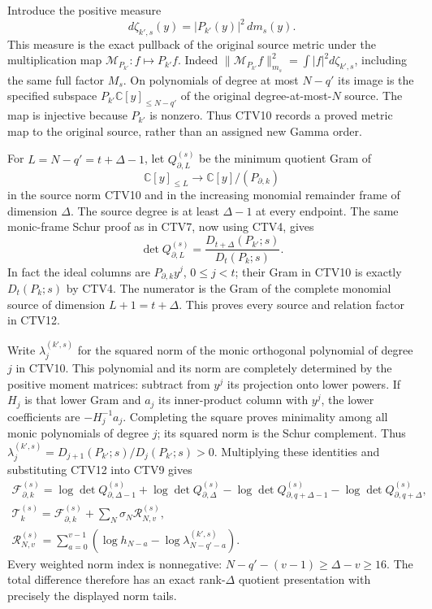 \documentclass[11pt,a4paper]{article}
\begin{document}
Introduce the positive measure
\[
 d\zeta_{k',s}(y)=|P_{k'}(y)|^2\,dm_s(y).
 \tag{CTV10}
\]
This measure is the exact pullback of the original source metric
under the multiplication map
$\mathcal M_{P_{k'}}:f\mapsto P_{k'}f$.
Indeed $\|\mathcal M_{P_{k'}}f\|_{m_s}^2
=\int|f|^2d\zeta_{k',s}$, including the same full factor $M_s$.
On polynomials of degree at most $N-q'$ its image is the specified
subspace $P_{k'}\mathbb C[y]_{\le N-q'}$ of the original
degree-at-most-$N$ source. The map is injective because $P_{k'}$
is nonzero. Thus CTV10 records a proved metric map to the
original source, rather than an assigned new Gamma order.

For $L=N-q'=t+\Delta-1$, let
$Q_{\partial,L}^{(s)}$ be the minimum quotient Gram of
\[
 \mathbb C[y]_{\le L}\longrightarrow
       \mathbb C[y]/(P_{\partial,k})
 \tag{CTV11}
\]
in the source norm CTV10 and in the increasing monomial
remainder frame of dimension $\Delta$.
The source degree is at least $\Delta-1$ at every endpoint.
The same monic-frame Schur proof as in CTV7, now using CTV4,
gives
\[
 \det Q_{\partial,L}^{(s)}
     =\frac{D_{t+\Delta}(P_{k'};s)}{D_t(P_k;s)} .
 \tag{CTV12}
\]
In fact the ideal columns are $P_{\partial,k}y^j$, $0\le j<t$;
their Gram in CTV10 is exactly $D_t(P_k;s)$ by CTV4.
The numerator is the Gram of the complete monomial source
of dimension $L+1=t+\Delta$. This proves every source and
relation factor in CTV12.

Write $\lambda_j^{(k',s)}$ for the squared norm of the monic
orthogonal polynomial of degree $j$ in CTV10. This polynomial
and its norm are completely determined by the positive moment
matrices: subtract from $y^j$ its projection onto lower powers.
If $H_j$ is that lower Gram and $a_j$ its inner-product column
with $y^j$, the lower coefficients are $-H_j^{-1}a_j$.
Completing the square proves minimality among all monic
polynomials of degree $j$; its squared norm is the Schur
complement. Thus
$\lambda_j^{(k',s)}=D_{j+1}(P_{k'};s)/D_j(P_{k'};s)>0$.
Multiplying these identities and substituting CTV12 into CTV9
gives
\[
 \begin{gathered}
 \mathcal F_{\partial,k}^{(s)}
    =\log\det Q_{\partial,\Delta-1}^{(s)}
       +\log\det Q_{\partial,\Delta}^{(s)}
       -\log\det Q_{\partial,q+\Delta-1}^{(s)}
       -\log\det Q_{\partial,q+\Delta}^{(s)},\\
 \mathcal T_k^{(s)}
    =\mathcal F_{\partial,k}^{(s)}
                        +\sum_N\sigma_N\mathcal R_{N,v}^{(s)},\\
 \mathcal R_{N,v}^{(s)}
    =\sum_{a=0}^{v-1}
          \left(\log h_{N-a}
                -\log\lambda_{N-q'-a}^{(k',s)}\right).
 \end{gathered}\tag{CTV13}
\]
Every weighted norm index is nonnegative:
$N-q'-(v-1)\ge\Delta-v\ge16$.
The total difference therefore has an exact rank-$\Delta$
quotient presentation with precisely the displayed norm tails.
\end{document}
